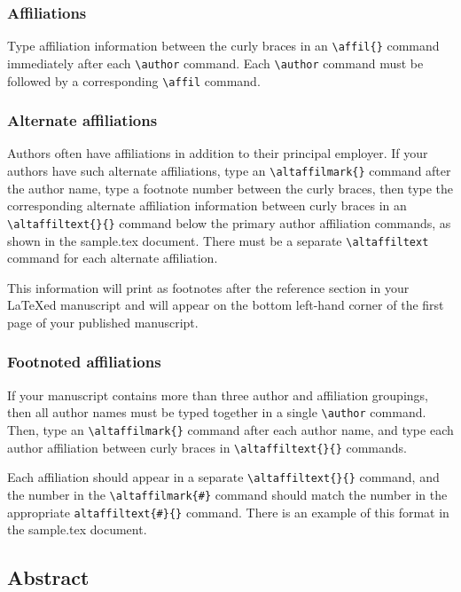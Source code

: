 \begin{article}
\subsubsection{Affiliations}

Type affiliation information between the curly braces 
in an \verb"\affil{}" command immediately after each 
\verb"\author" command.  \linebreak Each \verb"\author" 
command must be followed by a corresponding \verb"\affil"
command.


\subsubsection{Alternate affiliations}

Authors often have affiliations in addition to their 
principal employer.  If your authors have such 
alternate affiliations, type an \verb"\altaffilmark{}" 
command after the author name, type a footnote number 
between the curly braces, then type the corresponding 
alternate affiliation information between curly braces 
in an \verb"\altaffiltext{}{}" command below the primary
author affiliation commands, as shown in the sample.tex 
document.  There must be a separate \verb"\altaffiltext"
command for each alternate affiliation.

This information will print as footnotes after the 
reference section in your {\LaTeX}ed manuscript and 
will appear on the bottom left-hand corner of the 
first page of your published manuscript.


\subsubsection{Footnoted affiliations}

If your manuscript contains more than three author 
and affiliation groupings, then all author names must 
be typed together in a single \verb"\author" command.
Then, type an \verb"\altaffilmark{}" command after each 
author name, and type each author affiliation between 
curly braces in \verb"\altaffiltext{}{}" commands.

Each affiliation should appear in a separate \linebreak
\verb"\altaffiltext{}{}" command, and the number 
in the \verb"\altaffilmark{#}" command should match 
the number in the appropriate \verb"altaffiltext{#}{}" 
command.  There is an example of this format in the 
sample.tex document.


\subsection{Abstract}


\end{article}
